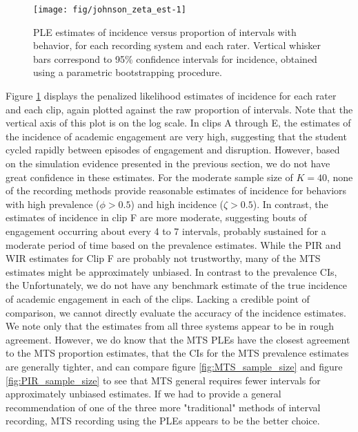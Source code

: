 \documentclass[man, noextraspace, floatsintext]{apa6}\usepackage[]{graphicx}\usepackage[]{color}
\newenvironment{knitrout}{}{} %
\begin{document}
\begin{knitrout}
\color{fgcolor}\begin{figure}[tb]

{\centering \texttt{[image: fig/johnson\_zeta\_est-1]} 

}

\caption[PLE estimates of incidence versus proportion of intervals with behavior, for each recording system and each rater]{PLE estimates of incidence versus proportion of intervals with behavior, for each recording system and each rater. Vertical whisker bars correspond to 95\% confidence intervals for incidence, obtained using a parametric bootstrapping procedure.}\label{fig:johnson_zeta_est}
\end{figure}


\end{knitrout}

Figure \ref{fig:johnson_zeta_est} displays the penalized likelihood estimates of incidence for each rater and each clip, again plotted against the raw proportion of intervals. Note that the vertical axis of this plot is on the log scale. 
In clips A through E, the estimates of the incidence of academic engagement are very high, suggesting that the student cycled rapidly between episodes of engagement and disruption.
However, based on the simulation evidence presented in the previous section, we do not have great confidence in these estimates.
For the moderate sample size of $K = 40$, none of the recording methods provide reasonable estimates of incidence for behaviors with high prevalence ($\phi > 0.5$) and high incidence ($\zeta > 0.5$). In contrast, the estimates of incidence in clip F are more moderate, suggesting bouts of engagement occurring about every 4 to 7 intervals, probably sustained for a moderate period of time based on the prevalence estimates. While the PIR and WIR estimates for Clip F are probably not trustworthy, many of the MTS estimates might be approximately unbiased. In contrast to the prevalence CIs, the 
Unfortunately, we do not have any benchmark estimate of the true incidence of academic engagement in each of the clips. 
Lacking a credible point of comparison, we cannot directly evaluate the accuracy of the incidence estimates. 
We note only that the estimates from all three systems appear to be in rough agreement. However, we do know that the MTS PLEs have the closest agreement to the MTS proportion estimates, that the CIs for the MTS prevalence estimates are generally tighter, and can compare figure \ref{fig:MTS_sample_size} and figure \ref{fig:PIR_sample_size} to see that MTS general requires fewer intervals for approximately unbiased estimates. If we had to provide a general recommendation of one of the three more "traditional" methods of interval recording, MTS recording using the PLEs appears to be the better choice. 
\end{document}
